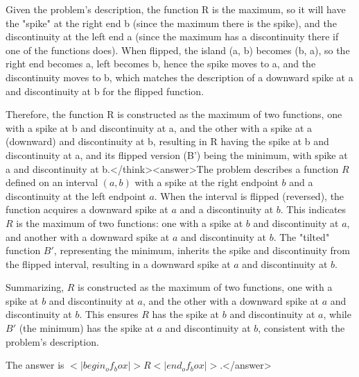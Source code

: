 Given the problem's description, the function R is the maximum, so it will have the "spike" at the right end b (since the maximum there is the spike), and the discontinuity at the left end a (since the maximum has a discontinuity there if one of the functions does). When flipped, the island (a, b) becomes (b, a), so the right end becomes a, left becomes b, hence the spike moves to a, and the discontinuity moves to b, which matches the description of a downward spike at a and discontinuity at b for the flipped function. 

Therefore, the function R is constructed as the maximum of two functions, one with a spike at b and discontinuity at a, and the other with a spike at a (downward) and discontinuity at b, resulting in R having the spike at b and discontinuity at a, and its flipped version (B') being the minimum, with spike at a and discontinuity at b.</think><answer>The problem describes a function \( R \) defined on an interval \( (a, b) \) with a spike at the right endpoint \( b \) and a discontinuity at the left endpoint \( a \). When the interval is flipped (reversed), the function acquires a downward spike at \( a \) and a discontinuity at \( b \). This indicates \( R \) is the maximum of two functions: one with a spike at \( b \) and discontinuity at \( a \), and another with a downward spike at \( a \) and discontinuity at \( b \). The "tilted" function \( B' \), representing the minimum, inherits the spike and discontinuity from the flipped interval, resulting in a downward spike at \( a \) and discontinuity at \( b \).  

Summarizing, \( R \) is constructed as the maximum of two functions, one with a spike at \( b \) and discontinuity at \( a \), and the other with a downward spike at \( a \) and discontinuity at \( b \). This ensures \( R \) has the spike at \( b \) and discontinuity at \( a \), while \( B' \) (the minimum) has the spike at \( a \) and discontinuity at \( b \), consistent with the problem's description.  

The answer is \(<|begin_of_box|>R<|end_of_box|>\).</answer>